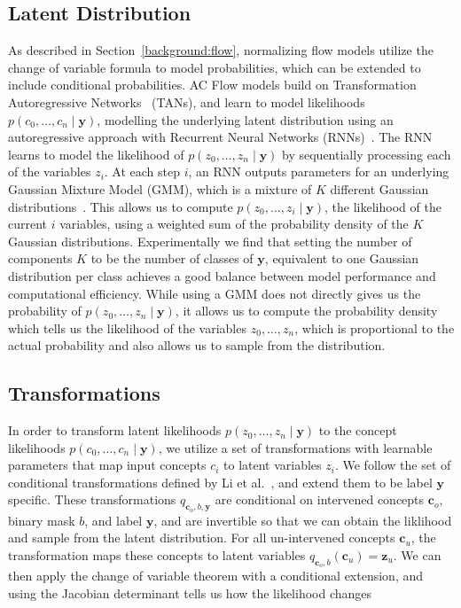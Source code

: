 \subsection{Latent Distribution}

As described in Section~\ref{background:flow}, 
normalizing flow models utilize the change of variable formula to model probabilities,
which can be extended to include conditional probabilities. AC Flow models build on
Transformation Autoregressive
Networks~\cite{tans} (TANs), and learn to model 
likelihoods $p(c_0,\ldots, c_n \mid \mathbf{y})$,
modelling the underlying latent distribution using an autoregressive approach with Recurrent
Neural Networks (RNNs)~\cite{rnn}. The RNN learns to model the likelihood of 
$p(z_0, \ldots, z_n \mid \mathbf{y})$ by sequentially processing each of the variables
 $z_i$.
At each step $i$, an RNN outputs parameters for an underlying Gaussian Mixture Model (GMM),
which is a mixture of $K$ different Gaussian distributions~\cite{gmm}.
This allows us to compute $p(z_0, \ldots, z_i \mid \mathbf{y})$,
the likelihood of the current $i$ variables,
using a weighted
sum of the probability density of the $K$ Gaussian distributions. Experimentally
we find that setting the number of components $K$ to be the number of classes of
$\mathbf{y}$, equivalent to one Gaussian distribution per 
class 
achieves
a good balance between model performance and computational efficiency.
While using a GMM does not directly gives us the probability of
$p(z_0, \ldots, z_n \mid \mathbf{y})$, 
it allows us to compute the probability density which tells us the likelihood of the
 variables $z_0, \ldots, z_n$, which is proportional
 to the actual probability and also allows us to sample from the distribution.

\subsection{Transformations}
In order to transform latent likelihoods $p(z_0, \ldots, z_n \mid \mathbf{y})$ to 
the concept likelihoods
$p(c_0,\ldots, c_n \mid \mathbf{y})$, we
utilize a set of transformations with learnable parameters that 
map input concepts $c_i$ to latent variables $z_i$. We follow the 
set of conditional transformations defined by Li et al.~\cite{acflow}, and extend them to
be label $\mathbf{y}$ specific.
These transformations $q_{\mathbf{c}_o, b, \mathbf{y}}$ are
conditional on 
intervened concepts $\mathbf{c}_o$, binary mask $b$, and label $\mathbf{y}$, 
and are invertible so that we can obtain the liklihood and 
sample from the latent distribution. 
For all un-intervened concepts $\mathbf{c}_u$,
the transformation maps these concepts to latent variables $q_{\mathbf{c}_o, b}(\mathbf{c}_u) = \mathbf{z}_u$. 
We can then apply the change
of variable theorem with a conditional extension, and using
the Jacobian determinant tells us how the likelihood changes~\cite{normalizing-flows}

